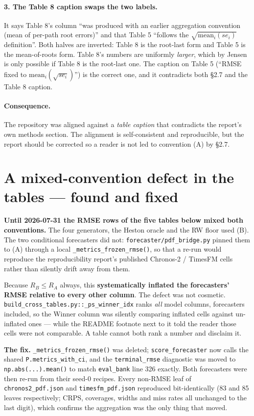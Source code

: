 \documentclass[11pt,a4paper]{article}
\begin{document}
\paragraph{3. The Table 8 caption swaps the two labels.} It says Table 8's
column ``was produced with an earlier aggregation convention (mean of per-path
root errors)'' and that Table 5 ``follows the $\sqrt{\mathrm{mean}_i(se_i)}$
definition''. Both halves are inverted: Table 8 is the root-last form and
Table 5 is the mean-of-roots form. Table 8's numbers are uniformly \emph{larger},
which by Jensen is only possible if Table 8 is the root-last one. The caption on
Table 5 (``RMSE fixed to $\mathrm{mean}_i(\sqrt{se_i})$'') is the correct one,
and it contradicts both \S2.7 and the Table 8 caption.

\paragraph{Consequence.} The repository was aligned against a \emph{table
caption} that contradicts the report's own methods section. The alignment is
self-consistent and reproducible, but the report should be corrected so a reader
is not led to convention (A) by \S2.7.


\section{A mixed-convention defect in the tables --- found and fixed}

\textbf{Until 2026-07-31 the RMSE rows of the five tables below mixed both
conventions.} The four generators, the Heston oracle and the RW floor used (B).
The two conditional forecasters did not: \texttt{forecaster/pdf\_bridge.py}
pinned them to (A) through a local \texttt{\_metrics\_frozen\_rmse()}, so that a
re-run would reproduce the reproducibility report's published Chronos-2 /
TimesFM cells rather than silently drift away from them.

Because $R_B \le R_A$ always, this \textbf{systematically inflated the
forecasters' RMSE relative to every other column}. The defect was not cosmetic.
\texttt{build\_cross\_tables.py::\_ps\_winner\_idx} ranks \emph{all} model
columns, forecasters included, so the Winner column was silently comparing
inflated cells against un-inflated ones --- while the README footnote next to it
told the reader those cells were not comparable. A table cannot both rank a
number and disclaim it.

\textbf{The fix.} \texttt{\_metrics\_frozen\_rmse()} was deleted;
\texttt{score\_forecaster} now calls the shared \texttt{P.metrics\_with\_ci},
and the \texttt{terminal\_rmse} diagnostic was moved to
\texttt{np.abs(...).mean()} to match \texttt{eval\_bank} line 326 exactly. Both
forecasters were then re-run from their seed-0 recipes. Every non-RMSE leaf of
\texttt{chronos2\_pdf.json} and \texttt{timesfm\_pdf.json} reproduced
bit-identically (83 and 85 leaves respectively; CRPS, coverages, widths and miss
rates all unchanged to the last digit), which confirms the aggregation was the
only thing that moved.
\end{document}
